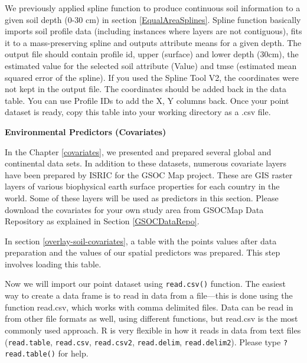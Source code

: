 \documentclass[10pt,b5paper,]{book}
\newenvironment{Shaded}{\begin{snugshade}}{\end{snugshade}}
\newcommand{\CommentTok}[1]{\textcolor[rgb]{0.56,0.35,0.01}{\textit{#1}}}
\newcommand{\KeywordTok}[1]{\textcolor[rgb]{0.13,0.29,0.53}{\textbf{#1}}}
\newcommand{\NormalTok}[1]{#1}
\newcommand{\OperatorTok}[1]{\textcolor[rgb]{0.81,0.36,0.00}{\textbf{#1}}}
\newcommand{\StringTok}[1]{\textcolor[rgb]{0.31,0.60,0.02}{#1}}
\theoremstyle{definition}
\theoremstyle{definition}
\theoremstyle{definition}
\theoremstyle{remark}
\begin{document}
We previously applied spline function to produce continuous soil
information to a given soil depth (0-30 cm) in section
\ref{EqualAreaSplines}. Spline function basically imports soil profile
data (including instances where layers are not contiguous), fits it to a
mass-preserving spline and outputs attribute means for a given depth.
The output file should contain profile id, upper (surface) and lower
depth (30cm), the estimated value for the selected soil attribute
(Value) and tmse (estimated mean squared error of the spline). If you
used the Spline Tool V2, the coordinates were not kept in the output
file. The coordinates should be added back in the data table. You can
use Profile IDs to add the X, Y columns back. Once your point dataset is
ready, copy this table into your working directory as a .csv file.

\textbf{Environmental Predictors (Covariates)}

In the Chapter \ref{covariates}, we presented and prepared several
global and continental data sets. In addition to these datasets,
numerous covariate layers have been prepared by ISRIC for the GSOC Map
project. These are GIS raster layers of various biophysical earth
surface properties for each country in the world. Some of these layers
will be used as predictors in this section. Please download the
covariates for your own study area from GSOCMap Data Repository as
explained in Section \ref{GSOCDataRepo}.

In section \ref{overlay-soil-covariates}, a table with the points values
after data preparation and the values of our spatial predictors was
prepared. This step involves loading this table.

Now we will import our point dataset using \texttt{read.csv()} function.
The easiest way to create a data frame is to read in data from a
file---this is done using the function read.csv, which works with comma
delimited files. Data can be read in from other file formats as well,
using different functions, but read.csv is the most commonly used
approach. R is very flexible in how it reads in data from text files
(\texttt{read.table}, \texttt{read.csv}, \texttt{read.csv2},
\texttt{read.delim}, \texttt{read.delim2}). Please type
\texttt{?read.table()} for help.

\begin{Shaded}
\end{Shaded}
\end{document}
